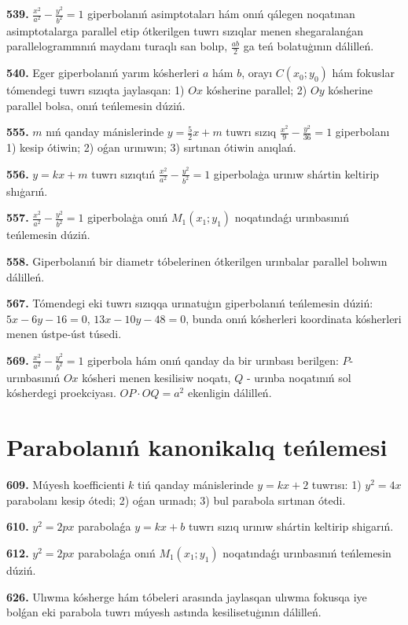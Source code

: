 \textbf{539.} $\frac{x^2}{a^2}-\frac{y^2}{b^2}=1$ giperbolanıń asimptotaları hám onıń qálegen noqatınan asimptotalarga parallel etip ótkerilgen tuwrı sızıqlar menen shegaralanǵan parallelogrammnıń maydanı turaqlı san bolıp, $\frac{a b}{2}$ ga teń bolatuģının dálilleń.

\textbf{540.} Eger giperbolanıń yarım kósherleri $a$ hám $b$, orayı $C\left(x_0; y_0\right) $ hám fokuslar tómendegi tuwrı sızıqta jaylasqan: 1) $O x$ kósherine parallel; 2) $O y$ kósherine parallel bolsa, onıń teńlemesin dúziń.

\textbf{555.} $m$ nıń qanday mánislerinde $y=\frac{5}{2} x+m$ tuwrı sızıq $\frac{x^2}{9}-\frac{y^2}{36}=1$ giperbolanı 1) kesip ótiwin; 2) oǵan urınıwın; 3) sırtınan ótiwin anıqlań.

\textbf{556.} $y=k x+m$ tuwrı sızıqtıń $\frac{x^2}{a^2}-\frac{y^2}{b^2}=1$ giperbolaģa urınıw shártin keltirip shıģarıń.

\textbf{557.} $\frac{x^2}{a^2}-\frac{y^2}{b^2}=1$ giperbolaģa onıń $M_1\left(x_1; y_1\right) $ noqatındaǵı urınbasınıń teńlemesin dúziń.

\textbf{558.} Giperbolanıń bir diametr tóbelerinen ótkerilgen urınbalar parallel bolıwın dálilleń.

\textbf{567.} Tómendegi eki tuwrı sızıqqa urınatuģın giperbolanıń teńlemesin dúziń: $5x-6y-16=0$, $13x-10y-48=0$, bunda onıń kósherleri koordinata kósherleri menen ústpe-úst túsedi.

\textbf{569.} $\frac{x^2}{a^2}-\frac{y^2}{b^2}=1$ giperbola hám onıń qanday da bir urınbası berilgen: $P$-urınbasınıń $O x$ kósheri menen kesilisiw noqatı, $Q$ - urınba noqatınıń sol kósherdegi proekciyası. $O P \cdot O Q=a^2$ ekenligin dálilleń.


\section{ Parabolanıń kanonikalıq teńlemesi}


\textbf{609.} Múyesh koefficienti $k$ tiń qanday mánislerinde $y=kx+2$ tuwrısı: 1) $y^2=4x$ parabolanı kesip ótedi; 2) oǵan urınadı; 3) bul parabola sırtınan ótedi.

\textbf{610.} $y^2=2 p x$ parabolaǵa $y=k x+b$ tuwrı sızıq urınıw shártin keltirip shigarıń.

\textbf{612.} $y^2=2 p x$ parabolaǵa onıń $M_1\left(x_1; y_1\right) $ noqatındaǵı urınbasınıń teńlemesin dúziń.

\textbf{626.} Ulıwma kósherge hám tóbeleri arasında jaylasqan ulıwma fokusqa iye bolǵan eki parabola tuwrı múyesh astında kesilisetuģının dálilleń.


